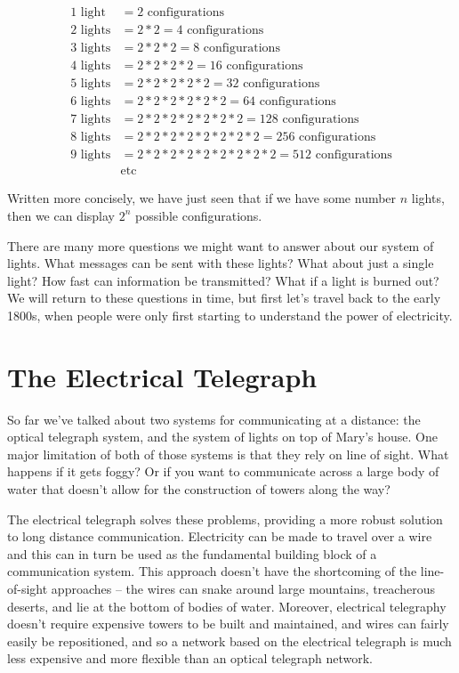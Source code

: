 \documentclass[UTF8]{book}
\begin{document}
\begin{CJK}{UTF8}{gbsn}
\begin{align*}
1 \text{ light} &= 2 \text{ configurations} \\
2 \text{ lights} &= 2*2 = 4 \text{ configurations} \\
3 \text{ lights} &= 2*2*2 = 8 \text{ configurations} \\
4 \text{ lights} &= 2*2*2*2 = 16 \text{ configurations} \\
5 \text{ lights} &= 2*2*2*2*2 = 32 \text{ configurations} \\
6 \text{ lights} &= 2*2*2*2*2*2 = 64 \text{ configurations} \\
7 \text{ lights} &= 2*2*2*2*2*2*2 = 128 \text{ configurations} \\
8 \text{ lights} &= 2*2*2*2*2*2*2*2 = 256 \text{ configurations} \\
9 \text{ lights} &= 2*2*2*2*2*2*2*2*2 = 512 \text{ configurations} \\
&\text{etc}
\end{align*}

Written more concisely, we have just seen that if we have some number $n$ lights, then we can display $2^n$ possible configurations.

There are many more questions we might want to answer about our system of lights. What messages can be sent with these lights? What about just a single light? How fast can information be transmitted? What if a light is burned out? We will return to these questions in time, but first let's travel back to the early 1800s, when people were only first starting to understand the power of electricity.

\chapter{The Electrical Telegraph}

So far we've talked about two systems for communicating at a distance: the optical telegraph system, and the system of lights on top of Mary's house. One major limitation of both of those systems is that they rely on line of sight. What happens if it gets foggy? Or if you want to communicate across a large body of water that doesn't allow for the construction of towers along the way?

The electrical telegraph solves these problems, providing a more robust solution to long distance communication. Electricity can be made to travel over a wire and this can in turn be used as the fundamental building block of a communication system. This approach doesn't have the shortcoming of the line-of-sight approaches – the wires can snake around large mountains, treacherous deserts, and lie at the bottom of bodies of water. Moreover, electrical telegraphy doesn't require expensive towers to be built and maintained, and wires can fairly easily be repositioned, and so a network based on the electrical telegraph is much less expensive and more flexible than an optical telegraph network.


\end{CJK}
\end{document}
